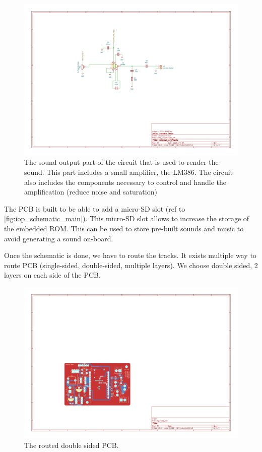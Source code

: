 \begin{figure}[h!]
    \centering
    \includegraphics[width=\textwidth]{images/iop-audio_circuit.pdf}
    \caption{The sound output part of the circuit that is used to render the sound. 
    This part includes a small amplifier, the LM386. The circuit also includes the components necessary
    to control and handle the amplification (reduce noise and saturation)} 
    \vspace{0.1cm}
    \label{fig:iop_schematic_audio}
\end{figure}

The PCB is built to be able to add a micro-SD slot (ref to \ref{fig:iop_schematic_main}). This micro-SD slot
allows to increase the storage of the embedded ROM. This can be used to store pre-built sounds and music 
to avoid generating a sound on-board.  


Once the schematic is done, we have to route the tracks. It exists multiple way to route PCB 
(single-sided, double-sided, multiple layers). We choose double sided, 2 layers on each side of the PCB.

\begin{figure}[h!]
    \centering
    \includegraphics[width=\textwidth]{images/iop-routed_pcb.pdf}
    \caption{The routed double sided PCB.} 
    \vspace{0.1cm}
    \label{fig:iop_routed_pcb}
\end{figure}

